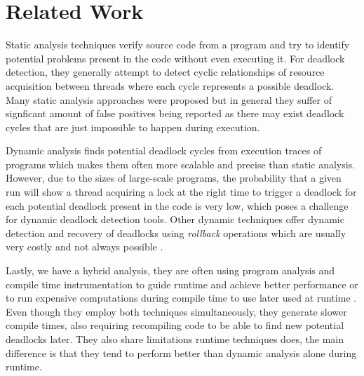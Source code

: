 \section{Related Work}

Static analysis techniques verify source code from a program and try to identify potential problems present in the code without even executing it.
For deadlock detection, they generally attempt to detect cyclic relationships of resource acquisition between threads where each cycle represents a possible deadlock.
Many static analysis approaches were proposed \cite{marino}\cite{dawson}\cite{vivek}\cite{williams}
but in general they suffer of signficant amount of false positives being reported as there may exist deadlock cycles that are just impossible to happen during execution.

Dynamic analysis \cite{mcsdk}\cite{magicfuzzer} finds potential deadlock cycles from execution traces of programs which makes them often more scalable and precise than static analysis.
However, due to the sizes of large-scale programs, the probability that a given run will show a thread acquiring a lock at the right time to trigger a deadlock for
each potential deadlock present in the code is very low, which poses a challenge for dynamic deadlock detection tools. Other dynamic techniques \cite{sammati} \cite{rx} offer dynamic detection and recovery of deadlocks using \emph{rollback} operations which are usually very costly and not always possible \cite{pyla}. 

Lastly, we have a hybrid analysis, they are often using program analysis and compile time instrumentation to guide runtime and achieve better performance \cite{serenity}
or to run expensive computations during compile time to use later used at runtime \cite{grechanik}. Even though they employ both techniques simultaneously, they generate slower compile times, also requiring recompiling code to be able to find new potential deadlocks later. They also share limitations runtime techniques does, the main difference is that they tend to perform better than dynamic analysis alone during runtime.
